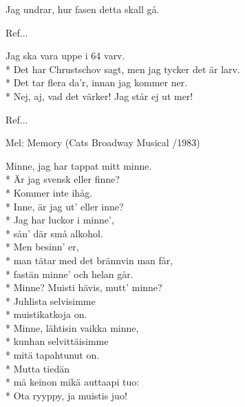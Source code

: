 \begin{SongText}
\begin{SongVerse}
        Jag undrar, hur fasen detta skall gå.
    \end{SongVerse}
    \begin{SongVerse}
        Ref...
    \end{SongVerse}
    \begin{SongVerse}
        Jag ska vara uppe i 64 varv.\\*%
        Det har Chrustschov sagt, men jag tycker det är larv.\\*%
        Det tar flera da’r, innan jag kommer ner.\\*%
        Nej, aj, vad det värker! Jag står ej ut mer!
    \end{SongVerse}
    \begin{SongVerse}
        Ref...
    \end{SongVerse}
\end{SongText}
\begin{SongText}[Minnet]
    \begin{SongInfo}
        Mel: Memory (Cats Broadway Musical /1983)
    \end{SongInfo}
    \begin{SongVerse}
        Minne, jag har tappat mitt minne.\\*%
        Är jag svensk eller finne?\\*%
        Kommer inte ihåg.\\*%
        Inne, är jag ut’ eller inne?\\*%
        Jag har luckor i minne’,\\*%
        sån’ där små alkohol.\\*%
        Men besinn’ er,\\*%
        man tätar med det brännvin man får,\\*%
        fastän minne’ och helan går.\\*%
        Minne? Muisti hävis, mutt’ minne?\\*%
        Juhlista selvisimme\\*%
        muistikatkoja on.\\*%
        Minne, lähtisin vaikka minne,\\*%
        kunhan selvittäisimme\\*%
        mitä tapahtunut on.\\*%
        Mutta tiedän\\*%
        mä keinon mikä auttaapi tuo:\\*%
        Ota ryyppy, ja muistis juo!
    \end{SongVerse}
\end{SongText}
